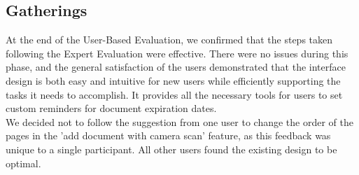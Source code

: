 \subsection{Gatherings}
At the end of the User-Based Evaluation, we confirmed that the steps taken following the Expert Evaluation were effective. There were no issues during this phase, and the general satisfaction of the users demonstrated that the interface design is both easy and intuitive for new users while efficiently supporting the tasks it needs to accomplish. It provides all the necessary tools for users to set custom reminders for document expiration dates.\\
We decided not to follow the suggestion from one user to change the order of the pages in the 'add document with camera scan' feature, as this feedback was unique to a single participant. All other users found the existing design to be optimal.

